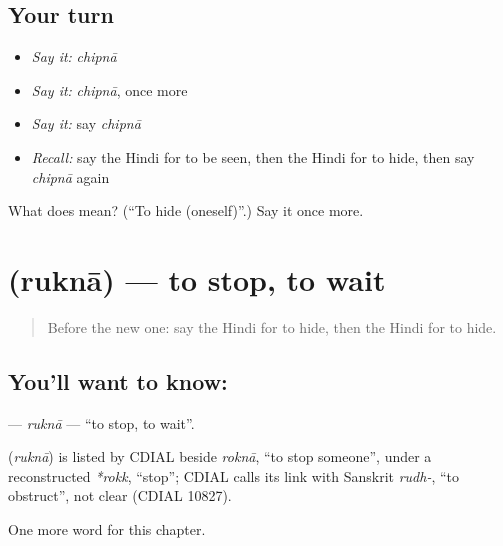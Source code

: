 \subsection*{Your turn}
\begin{itemize}
\raggedright
  \item \emph{Say it:} \emph{chipnā}
  \item \emph{Say it:} \emph{chipnā}, once more
  \item \emph{Say it:} say \emph{chipnā}
  \item \emph{Recall:} say the Hindi for to be seen, then the Hindi for to hide, then say \emph{chipnā} again
\end{itemize}

\begin{tcolorbox}[breakable,colback=teal!4,colframe=teal!35!black,title={Before you move on}]
What does  mean? (\textquotedblleft{}To hide (oneself)\textquotedblright{}.) Say it once more.
\end{tcolorbox}
\section[\texorpdfstring{\hi{रुकना} (ruknā)}{रुकना (ruknā)}]{ (ruknā) — to stop, to wait}

\label{lesson:HI-C171-rukna}



\begin{quote}
Before the new one: say the Hindi for to hide, then the Hindi for to hide.
\end{quote}

\subsection*{You'll want to know: }
\textbf{} — \emph{ruknā} — \textquotedblleft{}to stop, to wait\textquotedblright{}.

\begin{cousinweb}
\textbf{} (\emph{ruknā}) is listed by CDIAL beside \emph{roknā}, \textquotedblleft{}to stop someone\textquotedblright{}, under a reconstructed \emph{*rokk}, \textquotedblleft{}stop\textquotedblright{}; CDIAL calls its link with Sanskrit \emph{rudh-}, \textquotedblleft{}to obstruct\textquotedblright{}, not clear (CDIAL 10827).
\end{cousinweb}

\begin{grammarlens}[title={What you've built}]
One more word for this chapter.
\end{grammarlens}

